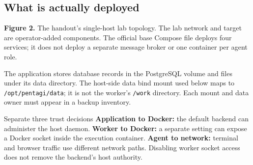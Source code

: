 \documentclass[11pt,letterpaper]{article}
\newcommand{\code}[1]{\nolinkurl{#1}}
\newcommand{\src}[1]{\cite{#1}}
\begin{document}
\subsection{What is actually deployed}
\begin{center}
\end{center}
{\small\textbf{Figure 2.} The handout's single-host lab topology. The lab network
and target are operator-added components. The official base Compose file
deploys four services; it does not deploy a separate message broker or one
container per agent role. \src{compose,flow}}

The application stores database records in the PostgreSQL volume and files under
its data directory. The host-side data bind mount used below maps to
\code{/opt/pentagi/data}; it is not the worker's \code{/work} directory.
Each mount and data owner must appear in a backup inventory.
\src{compose,files}

\begin{panel}{Separate three trust decisions}
\textbf{Application to Docker:} the default backend can administer the host
daemon. \textbf{Worker to Docker:} a separate setting can expose a Docker socket
inside the execution container. \textbf{Agent to network:} terminal and browser
traffic use different network paths. Disabling worker socket access does not
remove the backend's host authority. \src{docker-code,compose}
\end{panel}
\end{document}
